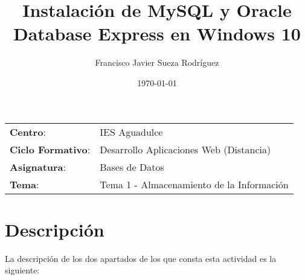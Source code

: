 


\title{
\normalfont \normalsize
\huge \textbf{Instalación de MySQL y Oracle Database Express en Windows 10}
}
\author{Francisco Javier Sueza Rodríguez}
\date{\normalsize\today}



\maketitle

\vspace{2ex}

\begin{center}
    \begin{tabular}{l l}
        \textbf{Centro}: & IES Aguadulce \\
        \textbf{Ciclo Formativo}: & Desarrollo Aplicaciones Web (Distancia)\\
        \textbf{Asignatura}: & Bases de Datos\\
        \textbf{Tema}: & Tema 1 - Almacenamiento de la Información \\
    \end{tabular}
\end{center}

\vspace{10ex}

\section{Descripción}
La descripción de los dos apartados de los que consta esta actividad es la siguiente:

